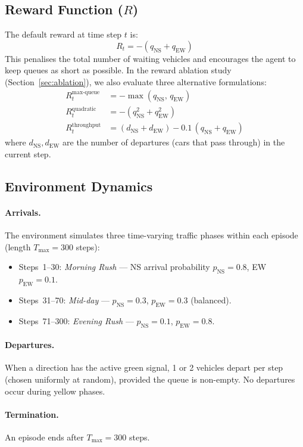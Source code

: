 \documentclass[12pt]{article}
\begin{document}
\subsection{Reward Function ($R$)}
The default reward at time step $t$ is:
\[
    R_t = -(q_\text{NS} + q_\text{EW})
\]
This penalises the total number of waiting vehicles and encourages the agent to keep
queues as short as possible. In the reward ablation study (Section~\ref{sec:ablation}),
we also evaluate three alternative formulations:
\begin{align}
    R^\text{max-queue}_t &= -\max(q_\text{NS},\, q_\text{EW}) \label{eq:maxq}\\
    R^\text{quadratic}_t &= -(q_\text{NS}^2 + q_\text{EW}^2) \label{eq:quad}\\
    R^\text{throughput}_t &= (d_\text{NS} + d_\text{EW}) - 0.1\,(q_\text{NS} + q_\text{EW}) \label{eq:tput}
\end{align}
where $d_\text{NS}, d_\text{EW}$ are the number of departures (cars that pass
through) in the current step.

\subsection{Environment Dynamics}
\paragraph{Arrivals.} The environment simulates three time-varying traffic phases
within each episode (length $T_\text{max}=300$ steps):
\begin{itemize}[noitemsep]
    \item Steps~1--30: \emph{Morning Rush} --- NS arrival probability $p_\text{NS}=0.8$, EW $p_\text{EW}=0.1$.
    \item Steps~31--70: \emph{Mid-day} --- $p_\text{NS}=0.3$, $p_\text{EW}=0.3$ (balanced).
    \item Steps~71--300: \emph{Evening Rush} --- $p_\text{NS}=0.1$, $p_\text{EW}=0.8$.
\end{itemize}

\paragraph{Departures.} When a direction has the active green signal, 1 or 2 vehicles
depart per step (chosen uniformly at random), provided the queue is non-empty. No
departures occur during yellow phases.

\paragraph{Termination.} An episode ends after $T_\text{max}=300$ steps.
\end{document}
